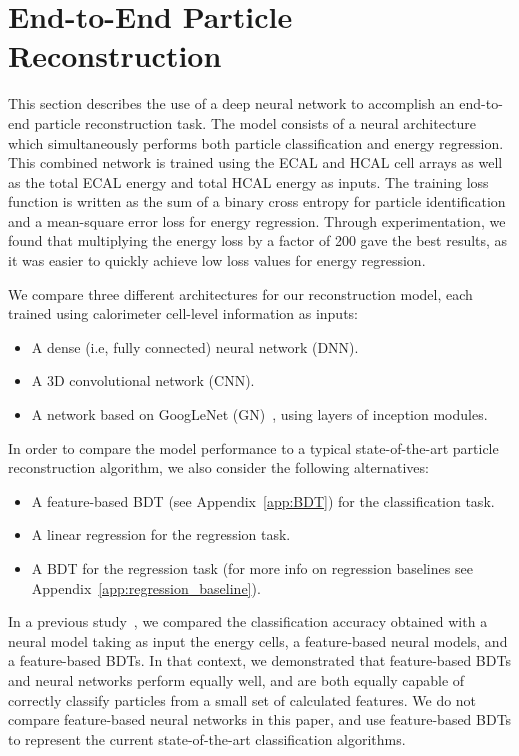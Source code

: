 \chapter{End-to-End Particle Reconstruction}
\label{sec:reco}

This section describes the use of a deep neural network to accomplish an end-to-end particle reconstruction task. The model consists of a neural architecture which simultaneously performs both particle classification and energy regression. This combined network is trained using the ECAL and HCAL cell arrays as well as the total ECAL energy and total HCAL energy as inputs. The training loss function is written as the sum of a binary cross entropy for particle identification and a mean-square error loss for energy regression. Through experimentation, we found that multiplying the energy loss by a factor of 200 gave the best results, as it was easier to quickly achieve low loss values for energy regression.

We compare three different architectures for our reconstruction model, each trained using calorimeter cell-level information as inputs:
\begin{itemize}
\item A dense (i.e, fully connected) neural network (DNN).
\item A 3D convolutional network (CNN).
\item A network based on GoogLeNet (GN)~\cite{GoogLeNet}, using layers of inception modules.
\end{itemize}

In order to compare the model performance to a typical state-of-the-art particle reconstruction algorithm, we also consider the following alternatives:
\begin{itemize}
    \item A feature-based BDT (see Appendix~\ref{app:BDT}) for the classification task.
    \item A linear regression for the regression task.
    \item A BDT for the regression task (for more info on regression baselines see Appendix~\ref{app:regression_baseline}).
\end{itemize}

In a previous study~\cite{NIPS}, we compared the classification accuracy obtained with a neural model taking as input the energy cells, a feature-based neural models, and a feature-based BDTs. In that context, we demonstrated that feature-based BDTs and neural networks perform equally well, and are both equally capable of correctly classify particles from a small set of calculated features. 
We do not compare feature-based neural networks in this paper, and use feature-based BDTs to represent the current state-of-the-art classification algorithms.

